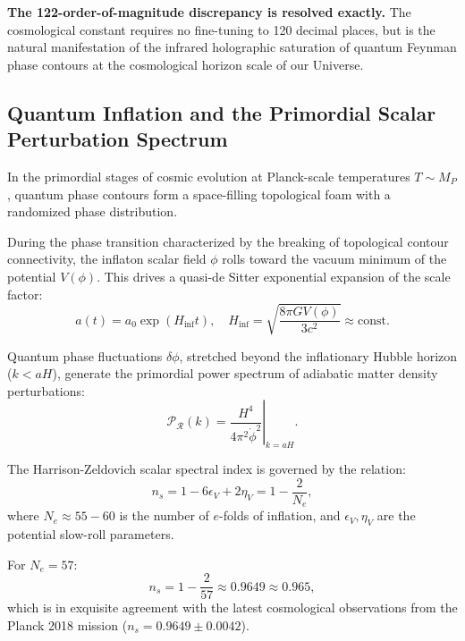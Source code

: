 \textbf{The 122-order-of-magnitude discrepancy is resolved exactly.}  
The cosmological constant requires no fine-tuning to 120 decimal places, but is the natural manifestation of the infrared holographic saturation of quantum Feynman phase contours at the cosmological horizon scale of our Universe.

\subsection{Quantum Inflation and the Primordial Scalar Perturbation Spectrum}\label{sec:3.4}

In the primordial stages of cosmic evolution at Planck-scale temperatures $T \sim M_P$, quantum phase contours form a space-filling topological foam with a randomized phase distribution.

During the phase transition characterized by the breaking of topological contour connectivity, the inflaton scalar field $\phi$ rolls toward the vacuum minimum of the potential $V(\phi)$. This drives a quasi-de Sitter exponential expansion of the scale factor:
\begin{equation}\label{eq:3.22}\tag{3.22}
a(t) = a_0 \exp(H_{\text{inf}} t), \quad H_{\text{inf}} = \sqrt{\frac{8\pi G V(\phi)}{3 c^2}} \approx \text{const}.
\end{equation}

Quantum phase fluctuations $\delta\phi$, stretched beyond the inflationary Hubble horizon ($k < a H$), generate the primordial power spectrum of adiabatic matter density perturbations:
\begin{equation}\label{eq:3.23}\tag{3.23}
\mathcal{P}_{\mathcal{R}}(k) = \left. \frac{H^4}{4\pi^2 \dot{\phi}^2} \right|_{k=aH}.
\end{equation}

The Harrison-Zeldovich scalar spectral index is governed by the relation:
\begin{equation}\label{eq:3.24}\tag{3.24}
n_s = 1 - 6\epsilon_V + 2\eta_V = 1 - \frac{2}{N_e},
\end{equation}
where $N_e \approx 55 - 60$ is the number of $e$-folds of inflation, and $\epsilon_V, \eta_V$ are the potential slow-roll parameters.

For $N_e = 57$:
\begin{equation}\label{eq:3.25}\tag{3.25}
n_s = 1 - \frac{2}{57} \approx \mathbf{0.9649} \approx 0.965,
\end{equation}
which is in exquisite agreement with the latest cosmological observations from the Planck 2018 mission ($n_s = 0.9649 \pm 0.0042$).

